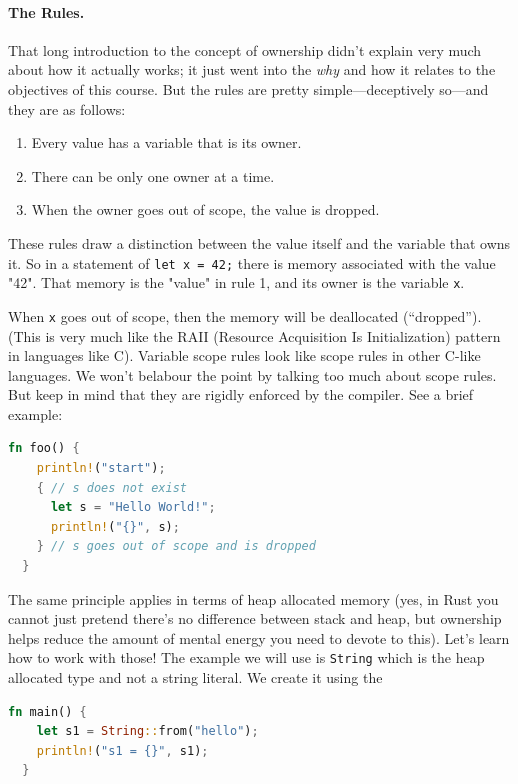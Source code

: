 \documentclass[a4paper]{report}
\newcommand{\CPP}{C\nolinebreak\hspace{-.05em}\raisebox{.4ex}{\tiny\bf +}\nolinebreak\hspace{-.10em}\raisebox{.4ex}{\tiny\bf +}}
\def\CPP{{C\nolinebreak[4]\hspace{-.05em}\raisebox{.4ex}{\tiny\bf ++}}}
\begin{document}
\paragraph{The Rules.}
That long introduction to the concept of ownership didn't explain very much about how it actually works; it just went into the \textit{why} and how it relates to the objectives of this course. But the rules are pretty simple---deceptively so---and they are as follows:

\begin{enumerate}
	\item Every value has a variable that is its owner.
	\item There can be only one owner at a time.
	\item When the owner goes out of scope, the value is dropped.
\end{enumerate}

These rules draw a distinction between the value itself and the variable that owns it. So in a statement of \texttt{let x = 42;} there is memory associated with the value "42". That memory is the "value" in rule 1, and its owner is the variable \texttt{x}.

When \texttt{x} goes out of scope, then the memory will be deallocated (``dropped''). (This is very much like the RAII (Resource Acquisition Is Initialization) pattern in languages like \CPP). Variable scope rules look like scope rules in other C-like languages. We won't belabour the point by talking too much about scope rules. But keep in mind that they are rigidly enforced by the compiler. See a brief example:
\begin{lstlisting}[language=Rust]
  fn foo() {
    println!("start");
    { // s does not exist
      let s = "Hello World!";
      println!("{}", s);
    } // s goes out of scope and is dropped
  }
\end{lstlisting}

The same principle applies in terms of heap allocated memory (yes, in Rust you cannot just pretend there's no difference between stack and heap, but ownership helps reduce the amount of mental energy you need to devote to this). Let's learn how to work with those! The example we will use is \texttt{String} which is the heap allocated type and not a string literal. We create it using the 
\begin{lstlisting}[language=Rust]
  fn main() {
    let s1 = String::from("hello");
    println!("s1 = {}", s1);
  }
\end{lstlisting}
\end{document}

